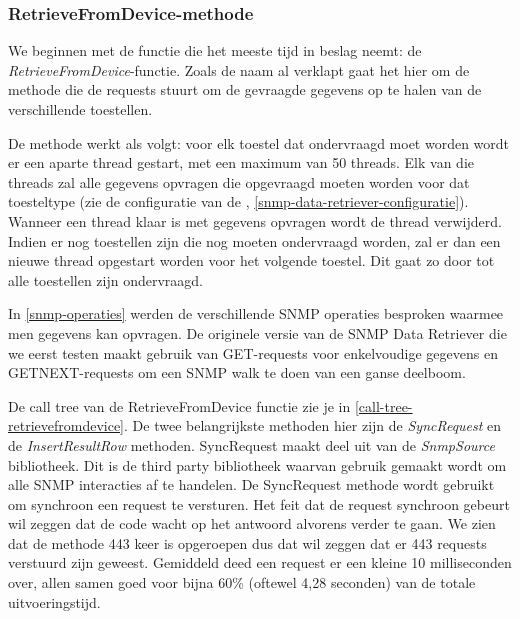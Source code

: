 \subsubsection{RetrieveFromDevice-methode}

We beginnen met de functie die het meeste tijd in beslag neemt: de \emph{RetrieveFromDevice}-functie.
Zoals de naam al verklapt gaat het hier om de methode die de requests stuurt om de gevraagde gegevens op te halen van de verschillende toestellen.


De methode werkt als volgt:
voor elk toestel dat ondervraagd moet worden wordt er een aparte thread gestart, met een maximum van 50 threads.
Elk van die threads zal alle gegevens opvragen die opgevraagd moeten worden voor dat toesteltype (zie de configuratie van de \nwmretriever, \cref{snmp-data-retriever-configuratie}).
Wanneer een thread klaar is met gegevens opvragen wordt de thread verwijderd.
Indien er nog toestellen zijn die nog moeten ondervraagd worden, zal er dan een nieuwe thread opgestart worden voor het volgende toestel. 
Dit gaat zo door tot alle toestellen zijn ondervraagd.

In \cref{snmp-operaties} werden de verschillende SNMP operaties besproken waarmee men
gegevens kan opvragen. De originele versie van de SNMP Data Retriever die we eerst testen maakt gebruik van
GET-requests voor enkelvoudige gegevens en GETNEXT-requests om een SNMP walk te doen van 
een ganse deelboom.

De call tree van de RetrieveFromDevice functie zie je in \cref{call-tree-retrievefromdevice}. %
De twee belangrijkste methoden hier zijn de \emph{SyncRequest} en de \emph{InsertResultRow} methoden. %
SyncRequest maakt deel uit van de \emph{SnmpSource} bibliotheek. %
Dit is de third party bibliotheek waarvan gebruik gemaakt wordt om alle SNMP interacties af te handelen. %
De SyncRequest methode wordt gebruikt om synchroon een request te versturen.
Het feit dat de request synchroon gebeurt wil zeggen dat de code wacht op het antwoord alvorens verder te gaan.
We zien dat de methode 443 keer is opgeroepen dus dat wil zeggen dat er 443 requests verstuurd zijn geweest.
Gemiddeld deed een request er een kleine 10 milliseconden over, allen samen goed voor bijna 60\% (oftewel 4,28 seconden) van de totale uitvoeringstijd.


